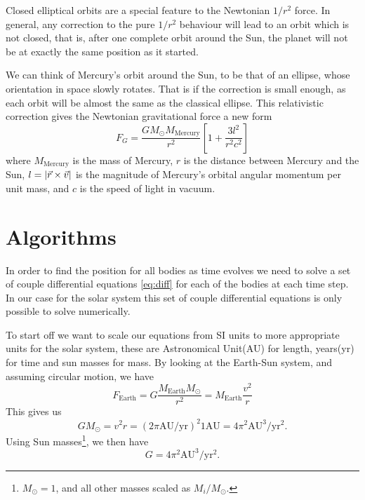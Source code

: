 \documentclass[%
reprint,
nofootinbib,
amsmath,amssymb,
aps,
]{revtex4-1}
\begin{document}
Closed elliptical orbits are a special feature to the Newtonian $1/r^2$ force. In general, any correction to the pure $1/r^2$ behaviour will lead to an orbit which is not closed, that is, after one complete orbit around the Sun, the planet will not be at exactly the same position as it started. 

We can think of Mercury's orbit around the Sun, to be that of an ellipse, whose orientation in space slowly rotates. That is if the correction is small enough, as each orbit will be almost the same as the classical ellipse. This relativistic correction gives the Newtonian gravitational force a new form
\begin{equation}
	F_G = \frac{GM_{\odot}M_{\text{Mercury}}}{r^2}\left[1 + \frac{3 l^2}{r^2c^2}\right]
\end{equation}
where $M_{\text{Mercury}}$ is the mass of Mercury, $r$ is the distance between Mercury and the Sun, $l = \abs{\vec{r}\times\vec{v}}$ is the magnitude of Mercury's orbital angular momentum per unit mass, and $c$ is the speed of light in vacuum. 
 
\section{Algorithms}%
In order to find the position for all bodies as time evolves we need to solve a set of couple differential equations \ref{eq:diff} for each of the bodies at each time step. In our case for the solar system this set of couple differential equations is only possible to solve numerically. 

To start off we want to scale our equations from SI units to more appropriate units for the solar system, these are Astronomical Unit(AU) for length, years(yr) for time and sun masses for mass. By looking at the Earth-Sun system, and assuming circular motion\cite{1994A&A...282..663S}, we have
\begin{equation}
	F_{\text{Earth}} = G\frac{M_{\text{Earth}}M_{\odot}}{r^2} = M_{\text{Earth}}\frac{v^2}{r}
\end{equation}
This gives us 
\begin{equation}
	GM_{\odot} = v^2 r = (2\pi \text{AU}/\text{yr})^2 1\text{AU} = 4\pi^2\text{AU}^3/\text{yr}^2.
\end{equation}
Using Sun masses\footnote{$M_{\odot} = 1$, and all other masses scaled as $M_i / M_{\odot}$.}, we then have 
\begin{equation}
	 G = 4\pi^2\text{AU}^3/\text{yr}^2.
\end{equation}
\end{document}
